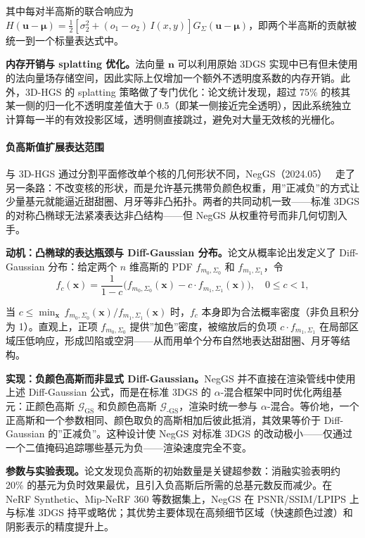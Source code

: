 其中每对半高斯的联合响应为 $H(\mathbf{u}-\boldsymbol{\mu}) = \frac{1}{2}\!\left[\sigma_2^2 + (o_1 - o_2)\,I(x,y)\right] \hat{G}_\Sigma(\mathbf{u}-\boldsymbol{\mu})$，即两个半高斯的贡献被统一到一个标量表达式中。

\textbf{内存开销与 splatting 优化。}法向量 $\mathbf{n}$ 可以利用原始 3DGS 实现中已有但未使用的法向量场存储空间，因此实际上仅增加一个额外不透明度系数的内存开销。此外，3D-HGS 的 splatting 策略做了专门优化：论文统计发现，超过 75\% 的核其某一侧的归一化不透明度差值大于 0.5（即某一侧接近完全透明），因此系统独立计算每一半的有效投影区域，透明侧直接跳过，避免对大量无效核的光栅化。

\paragraph{负高斯值扩展表达范围}

与 3D-HGS 通过分割平面修改单个核的几何形状不同，NegGS（2024.05）~\cite{2405_18163} 走了另一条路：不改变核的形状，而是允许基元携带负颜色权重，用”正减负”的方式让少量基元就能逼近甜甜圈、月牙等非凸拓扑。两者的共同动机一致——标准 3DGS 的对称凸椭球无法紧凑表达非凸结构——但 NegGS 从权重符号而非几何切割入手。

\textbf{动机：凸椭球的表达瓶颈与 Diff-Gaussian 分布。}论文从概率论出发定义了 Diff-Gaussian 分布：给定两个 $n$ 维高斯的 PDF $f_{m_0,\Sigma_0}$ 和 $f_{m_1,\Sigma_1}$，令
\begin{equation}
f_c(\mathbf{x}) = \frac{1}{1-c}\bigl(f_{m_0,\Sigma_0}(\mathbf{x}) - c \cdot f_{m_1,\Sigma_1}(\mathbf{x})\bigr), \quad 0 \leq c < 1,
\end{equation}

当 $c \leq \min_{\mathbf{x}}\, f_{m_0,\Sigma_0}(\mathbf{x}) / f_{m_1,\Sigma_1}(\mathbf{x})$ 时，$f_c$ 本身即为合法概率密度（非负且积分为 1）。直观上，正项 $f_{m_0,\Sigma_0}$ 提供”加色”密度，被缩放后的负项 $c \cdot f_{m_1,\Sigma_1}$ 在局部区域压低响应，形成凹陷或空洞——从而用单个分布自然地表达甜甜圈、月牙等结构。

\textbf{实现：负颜色高斯而非显式 Diff-Gaussian。}NegGS 并不直接在渲染管线中使用上述 Diff-Gaussian 公式，而是在标准 3DGS 的 $\alpha$-混合框架中同时优化两组基元：正颜色高斯 $\mathcal{G}_{\text{GS}}$ 和负颜色高斯 $\mathcal{G}_{\text{-GS}}$，渲染时统一参与 $\alpha$-混合。等价地，一个正高斯和一个参数相同、颜色取负的高斯相加后彼此抵消，其效果等价于 Diff-Gaussian 的”正减负”。这种设计使 NegGS 对标准 3DGS 的改动极小——仅通过一个二值掩码追踪哪些基元为负——渲染速度完全不变。

\textbf{参数与实验表现。}论文发现负高斯的初始数量是关键超参数：消融实验表明约 20\% 的基元为负时效果最优，且引入负高斯后所需的总基元数反而减少。在 NeRF Synthetic、Mip-NeRF 360 等数据集上，NegGS 在 PSNR/SSIM/LPIPS 上与标准 3DGS 持平或略优；其优势主要体现在高频细节区域（快速颜色过渡）和阴影表示的精度提升上。

